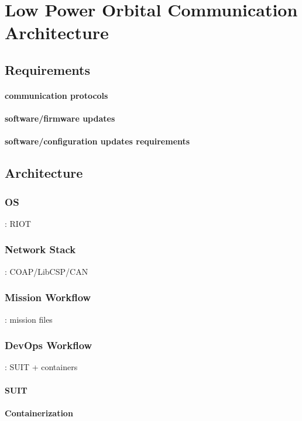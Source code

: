 \section{Low Power Orbital Communication Architecture}
\label{sec:low-power-orbital-communicaiton-arch}

\subsection{Requirements} 
\paragraph*{communication protocols} 
\paragraph*{software/firmware updates} 
\paragraph*{software/configuration updates requirements} 

\subsection{Architecture} 
\subsubsection{OS}: RIOT
\subsubsection{Network Stack}: COAP/LibCSP/CAN
\subsubsection{Mission Workflow}: mission files
\subsubsection{DevOps Workflow}: SUIT + containers
\paragraph*{SUIT}
\paragraph*{Containerization} 

